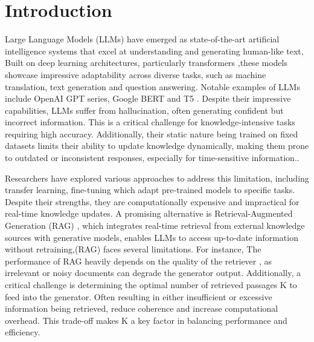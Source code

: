 \documentclass[review]{jair}
\begin{document}
\maketitle

\section{Introduction}
Large Language Models (LLMs) have emerged as state-of-the-art artificial intelligence systems that excel at understanding and generating human-like text\cite{Radford2019}, Built on deep learning architectures, particularly transformers \cite{vaswani2017attention},these models showcase impressive adaptability across diverse tasks, such as machine translation\cite{Gu2018SearchEngine}, text generation\cite{liang2024controllabletextgenerationlarge} and question answering\cite{Zhang2023}. Notable examples of LLMs include OpenAI GPT series\cite{brown2020language}, Google BERT\cite{devlin2018bert} and T5 \cite{raffel2020exploring}. Despite their impressive capabilities, LLMs suffer from hallucination\cite{Radford2019}, often generating confident but incorrect information. This is a critical challenge for knowledge-intensive tasks requiring high accuracy\cite{Radford2019}. Additionally, their static nature being trained on fixed datasets\cite{Radford2019} limits their ability to update knowledge dynamically, making them prone to outdated or inconsistent responses, especially for time-sensitive information.\cite{Mousavi2025}. 


Researchers have explored various approaches to address this limitation, including transfer learning\cite{zhuang2020comprehensive}, fine-tuning \cite{Howard2018} which adapt pre-trained models to specific tasks. Despite their strengths, they are computationally expensive and impractical for real-time knowledge updates. A promising alternative is Retrieval-Augmented Generation (RAG) \cite{Chuyuan2025}, which integrates real-time retrieval from external knowledge sources with generative models, enables LLMs to access up-to-date information without retraining,(RAG) faces several limitations. For instance, The performance of RAG heavily depends on the quality of the retriever \cite{karpukhin2020dpr}, as irrelevant or noisy documents can degrade the generator output. Additionally, a critical challenge is determining the optimal number of retrieved passages K to feed into the generator\cite{lewis2020retrieval}. Often resulting in either insufficient or excessive information being retrieved, reduce coherence and increase computational overhead. This trade-off makes K a key factor in balancing performance and efficiency. 
\end{document}
